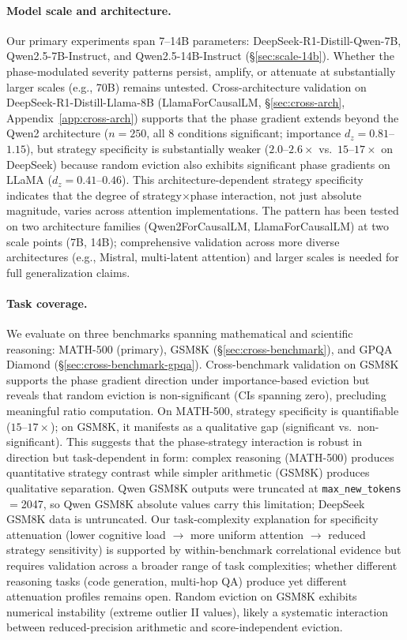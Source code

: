 \paragraph{Model scale and architecture.}
Our primary experiments span 7--14B parameters: DeepSeek-R1-Distill-Qwen-7B, Qwen2.5-7B-Instruct, and Qwen2.5-14B-Instruct (\S\ref{sec:scale-14b}). Whether the phase-modulated severity patterns persist, amplify, or attenuate at substantially larger scales (e.g., 70B) remains untested. Cross-architecture validation on DeepSeek-R1-Distill-Llama-8B (LlamaForCausalLM, \S\ref{sec:cross-arch}, Appendix~\ref{app:cross-arch}) supports that the phase gradient extends beyond the Qwen2 architecture ($n{=}250$, all 8 conditions significant; importance $d_z{=}0.81$--$1.15$), but strategy specificity is substantially weaker ($2.0$--$2.6{\times}$ vs.\ $15$--$17{\times}$ on DeepSeek) because random eviction also exhibits significant phase gradients on LLaMA ($d_z{=}0.41$--$0.46$). This architecture-dependent strategy specificity indicates that the degree of strategy${\times}$phase interaction, not just absolute magnitude, varies across attention implementations. The pattern has been tested on two architecture families (Qwen2ForCausalLM, LlamaForCausalLM) at two scale points (7B, 14B); comprehensive validation across more diverse architectures (e.g., Mistral, multi-latent attention) and larger scales is needed for full generalization claims.

\paragraph{Task coverage.}
We evaluate on three benchmarks spanning mathematical and scientific reasoning: MATH-500 (primary), GSM8K (\S\ref{sec:cross-benchmark}), and GPQA Diamond (\S\ref{sec:cross-benchmark-gpqa}). Cross-benchmark validation on GSM8K supports the phase gradient direction under importance-based eviction but reveals that random eviction is non-significant (CIs spanning zero), precluding meaningful ratio computation. On MATH-500, strategy specificity is quantifiable ($15$--$17{\times}$); on GSM8K, it manifests as a qualitative gap (significant vs.\ non-significant). This suggests that the phase-strategy interaction is robust in direction but task-dependent in form: complex reasoning (MATH-500) produces quantitative strategy contrast while simpler arithmetic (GSM8K) produces qualitative separation. Qwen GSM8K outputs were truncated at \texttt{max\_new\_tokens}${=}$2047, so Qwen GSM8K absolute values carry this limitation; DeepSeek GSM8K data is untruncated. Our task-complexity explanation for specificity attenuation (lower cognitive load $\to$ more uniform attention $\to$ reduced strategy sensitivity) is supported by within-benchmark correlational evidence but requires validation across a broader range of task complexities; whether different reasoning tasks (code generation, multi-hop QA) produce yet different attenuation profiles remains open. Random eviction on GSM8K exhibits numerical instability (extreme outlier II values), likely a systematic interaction between reduced-precision arithmetic and score-independent eviction.

